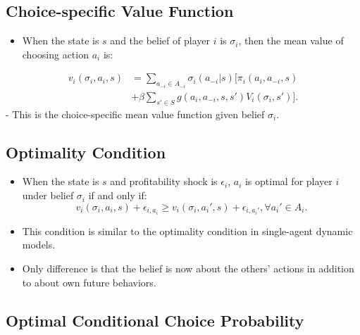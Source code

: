 \documentclass[
]{book}
\providecommand{\tightlist}{%
  \setlength{\itemsep}{0pt}\setlength{\parskip}{0pt}}
\begin{document}
\hypertarget{choice-specific-value-function-1}{%
\subsection{Choice-specific Value Function}\label{choice-specific-value-function-1}}

\begin{itemize}
\tightlist
\item
  When the state is \(s\) and the belief of player \(i\) is \(\sigma_i\), then the mean value of choosing action \(a_i\) is:
\end{itemize}

\begin{equation}
\begin{split}
v_i(\sigma_i, a_i, s) &= \sum_{a_{-i} \in A_{-i}} \sigma_i(a_{-i}|s)[ \pi_i(a_i, a_{-i}, s) \\
&+ \beta \sum_{s' \in S} g(a_i, a_{-i}, s, s') V_i(\sigma_i, s')].
\end{split}
\end{equation}
- This is the choice-specific mean value function given belief \(\sigma_i\).

\hypertarget{optimality-condition-2}{%
\subsection{Optimality Condition}\label{optimality-condition-2}}

\begin{itemize}
\tightlist
\item
  When the state is \(s\) and profitability shock is \(\epsilon_i\), \(a_i\) is optimal for player \(i\) under belief \(\sigma_i\) if and only if:
  \begin{equation}
  v_i(\sigma_i, a_i, s) + \epsilon_{i, a_i} \ge  v_i(\sigma_i, a_i', s) + \epsilon_{i, a_i'}, \forall a_i' \in A_i.
  \end{equation}
\item
  This condition is similar to the optimality condition in single-agent dynamic models.
\item
  Only difference is that the belief is now about the others' actions in addition to about own future behaviors.
\end{itemize}

\hypertarget{optimal-conditional-choice-probability-2}{%
\subsection{Optimal Conditional Choice Probability}\label{optimal-conditional-choice-probability-2}}
\end{document}
